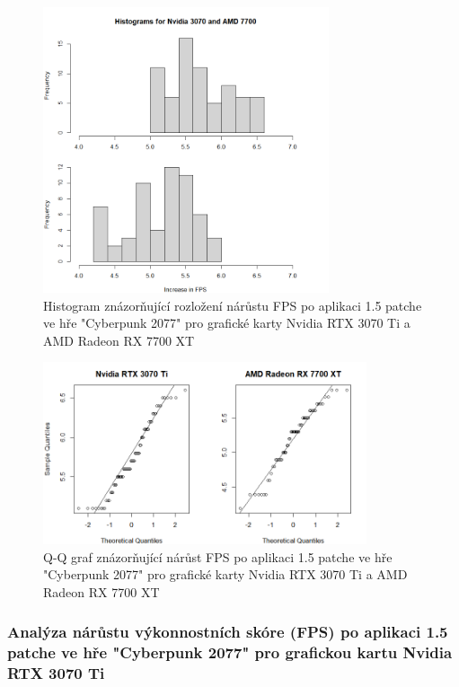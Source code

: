 \begin{figure}[h!]
    \centering
    \includegraphics[width=0.75\textwidth]{assets/histogram}
    \caption{Histogram znázorňující rozložení nárůstu FPS po aplikaci 1.5 patche ve hře "Cyberpunk 2077" pro grafické karty Nvidia RTX 3070 Ti a AMD Radeon RX 7700 XT}
    \label{fig:histogram}
\end{figure}

\begin{figure}[h!]
    \centering
    \includegraphics[width=0.85\textwidth]{assets/qq}
    \caption{Q-Q graf znázorňující nárůst FPS po aplikaci 1.5 patche ve hře "Cyberpunk 2077" pro grafické karty Nvidia RTX 3070 Ti a AMD Radeon RX 7700 XT}
    \label{fig:qq}
\end{figure}

\newpage
\subsubsection*{Analýza nárůstu výkonnostních skóre (FPS) po aplikaci 1.5 patche ve hře "Cyberpunk 2077" pro grafickou kartu Nvidia RTX 3070 Ti}

